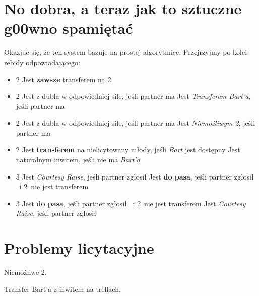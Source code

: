 \documentclass[12pt, a4paper]{article}
\begin{document}
    \pagebreak
    \section{No dobra, a teraz jak to sztuczne g00wno spamiętać}
    Okazjue się, że ten system bazuje na prostej algorytmice. 
    Przejrzyjmy po kolei rebidy odpowiadającego:

    \begin{itemize}
        \item 2\diams
        \subitem Jest \textbf{zawsze} transferem na 2\hearts.
        \item 2\hearts
        \subitem Jest z dubla w odpowiedniej sile, jeśli partner ma \hearts
        \subitem Jest \emph{Transferem Bart'a}, jeśli partner ma \spades
        \item 2\spades
        \subitem Jest z dubla w odpowiedniej sile, jeśli partner ma \spades 
        \subitem Jest \emph{Niemożliwym 2\spades}, jeśli partner ma \hearts
        \item 2\nt
        \subitem Jest \textbf{transferem} na nielicytowany młody, jeśli \emph{Bart} jest dostępny
        \subitem Jest naturalnym inwitem, jeśli nie ma \emph{Bart'a}
        \item 3\clubs
        \subitem Jest \emph{Courtesy Raise}, jeśli partner zgłosił \clubs
        \subitem Jest \textbf{do pasa}, jeśli partner zgłosił \diams\ i 2\nt\ nie jest transferem
        \item 3\diams 
        \subitem Jest \textbf{do pasa}, jeśli partner zgłosił \clubs\ i 2\nt\ nie jest transferem
        \subitem Jest \emph{Courtesy Raise}, jeśli partner zgłosił \diams 
    \end{itemize}

    \pagebreak
    \section{Problemy licytacyjne}

    \begin{hand}[h!]
        \webidding{
            1\hearts & 1\nt \\
            2\diams & 2\spades \\
            3\diams & 3\nt
        }
        \caption{Niemożliwe 2\spades.}
    \end{hand}

    \begin{hand}[h!]
        \webidding{
            1\spades & 1\nt \\
            2\clubs & 2\hearts \\
            2\spades & 3\clubs \\
            3\nt
        }
        \caption{Transfer Bart'a z inwitem na treflach.}
    \end{hand}
\end{document}

